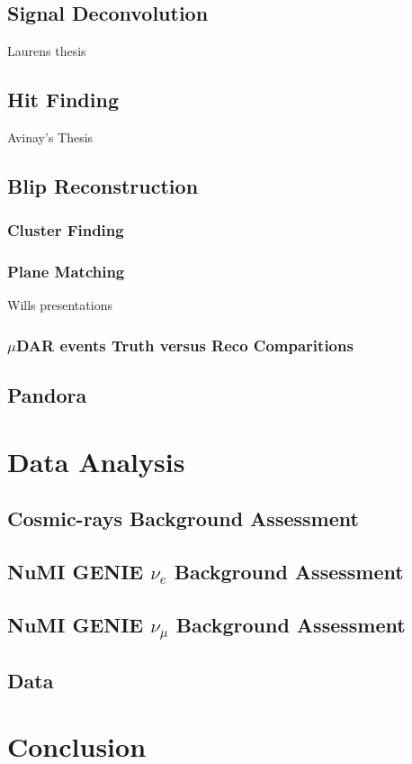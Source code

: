 \subsection{Signal Deconvolution}
Laurens thesis 

\subsection{Hit Finding}

Avinay's Thesis

\subsection{Blip Reconstruction}

\subsubsection{Cluster Finding}
\subsubsection{Plane Matching}

Wills presentations 

\subsubsection{$\mu$DAR events Truth versus Reco Comparitions}
\subsection{Pandora}

\section{Data Analysis}
\subsection{Cosmic-rays Background Assessment}
\subsection{NuMI GENIE $\nu_e$ Background Assessment}
\subsection{NuMI GENIE $\nu_{\mu}$ Background Assessment}
\subsection{Data}
\section{Conclusion}